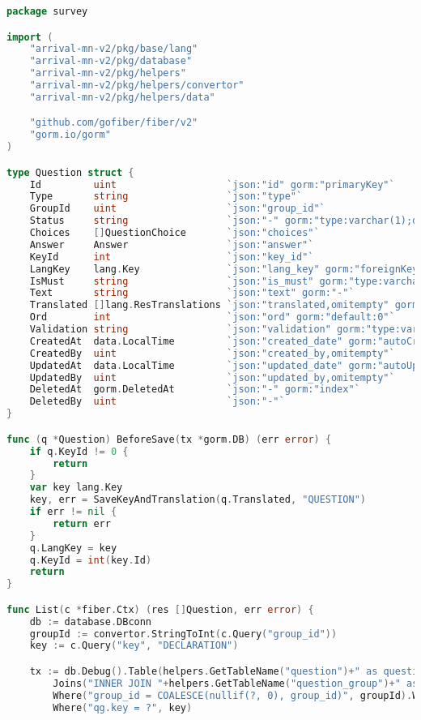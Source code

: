 \begin{lstlisting}[language=Go, caption=Модулийн Model, frame=single]
package survey

import (
	"arrival-mn-v2/pkg/base/lang"
	"arrival-mn-v2/pkg/database"
	"arrival-mn-v2/pkg/helpers"
	"arrival-mn-v2/pkg/helpers/convertor"
	"arrival-mn-v2/pkg/helpers/data"

	"github.com/gofiber/fiber/v2"
	"gorm.io/gorm"
)

type Question struct {
	Id         uint                   `json:"id" gorm:"primaryKey"`
	Type       string                 `json:"type"`
	GroupId    uint                   `json:"group_id"`
	Status     string                 `json:"-" gorm:"type:varchar(1);default:'A'"`
	Choices    []QuestionChoice       `json:"choices"`
	Answer     Answer                 `json:"answer"`
	KeyId      int                    `json:"key_id"`
	LangKey    lang.Key               `json:"lang_key" gorm:"foreignKey:KeyId"`
	IsMust     string                 `json:"is_must" gorm:"type:varchar(1);default:'N'"`
	Text       string                 `json:"text" gorm:"-"`
	Translated []lang.ResTranslations `json:"translated,omitempty" gorm:"-"`
	Ord        int                    `json:"ord" gorm:"default:0"`
	Validation string                 `json:"validation" gorm:"type:varchar(20)"`
	CreatedAt  data.LocalTime         `json:"created_date" gorm:"autoCreateTime"`
	CreatedBy  uint                   `json:"created_by,omitempty"`
	UpdatedAt  data.LocalTime         `json:"updated_date" gorm:"autoUpdateTime"`
	UpdatedBy  uint                   `json:"updated_by,omitempty"`
	DeletedAt  gorm.DeletedAt         `json:"-" gorm:"index"`
	DeletedBy  uint                   `json:"-"`
}

func (q *Question) BeforeSave(tx *gorm.DB) (err error) {
	if q.KeyId != 0 {
		return
	}
	var key lang.Key
	key, err = SaveKeyAndTranslation(q.Translated, "QUESTION")
	if err != nil {
		return err
	}
	q.LangKey = key
	q.KeyId = int(key.Id)
	return
}

func List(c *fiber.Ctx) (res []Question, err error) {
	db := database.DBconn
	groupId := convertor.StringToInt(c.Query("group_id"))
	key := c.Query("key", "DECLARATION")

	tx := db.Debug().Table(helpers.GetTableName("question")+" as question").
		Joins("INNER JOIN "+helpers.GetTableName("question_group")+" as qg ON qg.id = question.group_id").
		Where("group_id = COALESCE(nullif(?, 0), group_id)", groupId).Where("question.status = 'A'").
		Where("qg.key = ?", key)


\end{lstlisting}
